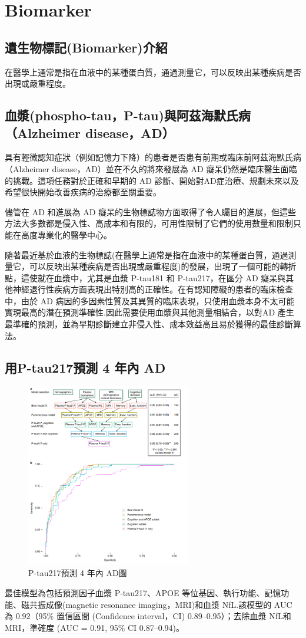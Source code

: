 \chapter{Biomarker}
\label{chapter:intro}
\section{遺生物標記(Biomarker)介紹}
在醫學上通常是指在血液中的某種蛋白質，通過測量它，可以反映出某種疾病是否出現或嚴重程度。


\label{sec:background}
\section{血漿(phospho-tau，P-tau)與阿茲海默氏病（Alzheimer disease，AD）}

具有輕微認知症狀（例如記憶力下降）的患者是否患有前期或臨床前阿茲海默氏病（Alzheimer disease，AD）並在不久的將來發展為 AD 癡呆仍然是臨床醫生面臨的挑戰。這項任務對於正確和早期的 AD 診斷、開始對AD症治療、規劃未來以及希望很快開始改善疾病的治療都至關重要。

儘管在 AD 和進展為 AD 癡呆的生物標誌物方面取得了令人矚目的進展，但這些方法大多數都是侵入性、高成本和有限的，可用性限制了它們的使用數量和限制只能在高度專業化的醫學中心。
 
隨著最近基於血液的生物標誌(在醫學上通常是指在血液中的某種蛋白質，通過測量它，可以反映出某種疾病是否出現或嚴重程度)的發展，出現了一個可能的轉折點，這使就在血漿中，尤其是血漿 P-tau181 和 P-tau217，在區分 AD 癡呆與其他神經退行性疾病方面表現出特別高的正確性。在有認知障礙的患者的臨床檢查中，由於 AD 病因的多因素性質及其異質的臨床表現，只使用血漿本身不太可能實現最高的潛在預測準確性.因此需要使用血漿與其他測量相結合，以對AD 產生最準確的預測，並為早期診斷建立非侵入性、成本效益高且易於獲得的最佳診斷算法。


\section{用P-tau217預測 4 年內 AD }
\begin{figure}[H]
	\centerline{\includegraphics[height=8cm]{pic/AD217.PNG}}
	\caption{P-tau217預測 4 年內 AD圖}
	\label{fig:AD217}
\end{figure}
最佳模型為包括預測因子血漿 P-tau217、APOE 等位基因、執行功能、記憶功能、磁共振成像(magnetic resonance imaging，MRI)和血漿 NfL.該模型的 AUC 為 0.92（95\% 置信區間 (Confidence interval，CI) 0.89–0.95）；去除血漿 NfL和MRI，準確度 (AUC = 0.91, 95\% CI 0.87–0.94)。


